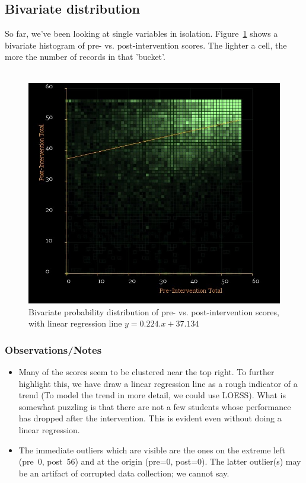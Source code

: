 \documentclass[10pt]{article}
\begin{document}
\subsection{Bivariate distribution}
So far, we've been looking at single variables in isolation. Figure~\ref{BivariatePrePost} shows a bivariate histogram of pre- vs. post-intervention scores. The lighter a cell, the more the number of records in that 'bucket'.\\\\
\begin{figure}
\caption{Bivariate probability distribution of pre- vs. post-intervention scores, with linear regression line $y = 0.224.x + 37.134$}
\label{BivariatePrePost}
\begin{center}
\includegraphics[width=160mm]{ReportMedia/BivariatePrePost.jpg}
\end{center}
\end{figure}
\subsubsection{Observations/Notes}
\begin{itemize}
\item Many of the scores seem to be clustered near the top right. To further highlight this, we have draw a linear regression line as a rough indicator of a trend (To model the trend in more detail, we could use LOESS). What is somewhat puzzling is that there are not a few students whose performance has dropped after the intervention. This is evident even without doing a linear regression.
\item The immediate outliers which are visible are the ones on the extreme left (pre~0, post~56) and at the origin (pre=0, post=0). The latter outlier(s) may be an artifact of corrupted data collection; we cannot say.
\end{itemize}
\end{document}
